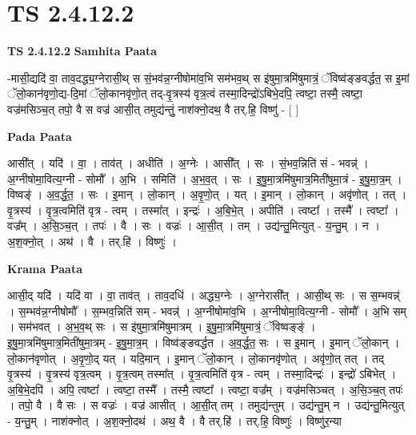\documentclass[17pt]{extarticle}
\begin{document}
\section{ TS 2.4.12.2 }

\textbf{TS 2.4.12.2 } \newline
\textbf{Samhita Paata} \newline

-मासी॒द्यदि॑ वा॒ ताव॒दद्ध्य॒ग्नेरासी॒थ् स सं॒भव॑न्न॒ग्नीषोमा॑व॒भि सम॑भव॒थ् स इ॑षुमा॒त्रमि॑षुमात्रं॒ ॅविष्व॑ङ्ङवर्द्धत॒ स इ॒मां ॅलो॒कान॑वृणो॒द्य-दि॒मां ॅलो॒कानवृ॑णो॒त् तद्-वृ॒त्रस्य॑ वृत्र॒त्वं तस्मा॒दिन्द्रो॑ऽबिभे॒दपि॒ त्वष्टा॒ तस्मै॒ त्वष्टा॒ वज्र॑मसिञ्च॒त् तपो॒ वै स वज्र॑ आसी॒त् तमुद्य॑न्तुं॒ नाश॑क्नो॒दथ॒ वै तर्.हि॒ विष्णु॑ - [  ] \newline

\textbf{Pada Paata} \newline

आसी᳚त् । यदि॑ । वा॒ । ताव॑त् । अधीति॑ । अ॒ग्नेः । आसी᳚त् ।   सः । सं॒भव॒न्निति॑ सं - भवन्न्॑ । अ॒ग्नीषोमा॒वित्य॒ग्नी - सोमौ᳚ । अ॒भि । समिति॑ । अ॒भ॒व॒त् । सः । इ॒षु॒मा॒त्रमि॑षुमात्र॒मिती॑षुमा॒त्रं - इ॒षु॒मा॒त्र॒म् । विष्वङ्॑ । अ॒व॒र्द्ध॒त॒ । सः । इ॒मान् । लो॒कान् । अ॒वृ॒णो॒त् । यत् । इ॒मान् । लो॒कान् । अवृ॑णोत् । तत् । वृ॒त्रस्य॑ । वृ॒त्र॒त्वमिति॑ वृत्र - त्वम् । तस्मा᳚त् । इन्द्रः॑ । अ॒बि॒भे॒त् । अपीति॑ । त्वष्टा᳚ । तस्मै᳚ । त्वष्टा᳚ । वज्र᳚म् । अ॒सि॒ञ्च॒त् । तपः॑ । वै । सः । वज्रः॑ । आ॒सी॒त् । तम् । उद्य॑न्तु॒मित्युत् -   य॒न्तु॒म् । न । अ॒श॒क्नो॒त् । अथ॑ । वै । तर्.हि॑ । विष्णुः॑ ।  \newline


\textbf{Krama Paata} \newline

आसी॒द् यदि॑ । यदि॑ वा । वा॒ ताव॑त् । ताव॒दधि॑ । अद्ध्य॒ग्नेः । अ॒ग्नेरासी᳚त् । आसी॒थ् सः । स स॒म्भवन्न्॑ । स॒म्भव॑न्न॒ग्नीषोमौ᳚ । स॒म्भव॒न्निति॑ सम् - भवन्न्॑ । अ॒ग्नीषोमा॑व॒भि । अ॒ग्नीषोमा॒वित्य॒ग्नी - सोमौ᳚ । अ॒भि सम् । सम॑भवत् । अ॒भ॒व॒थ् सः । स इ॑षुमा॒त्रमि॑षुमात्रम् । इ॒षु॒मा॒त्रमि॑षुमात्रं॒ ॅविष्वङ्ङ्॑ । इ॒षु॒मा॒त्रमि॑षुमात्र॒मिती॑षुमा॒त्रम् - इ॒षु॒मा॒त्र॒म् । विष्व॑ङ्ङवर्द्धत । अ॒व॒र्द्ध॒त॒ सः । स इ॒मान् । इ॒मान् ॅलो॒कान् । लो॒कान॑वृणोत् । अ॒वृ॒णो॒द् यत् । यदि॒मान् । इ॒मान् ॅलो॒कान् । लो॒कानवृ॑णोत् । अवृ॑णो॒त् तत् । तद् वृ॒त्रस्य॑ । वृ॒त्रस्य॑ वृत्र॒त्वम् । वृ॒त्र॒त्वम् तस्मा᳚त् । वृ॒त्र॒त्वमिति॑ वृत्र - त्वम् । तस्मा॒दिन्द्रः॑ । इन्द्रो॑ ऽबिभेत् । अ॒बि॒भे॒दपि॑ । अपि॒ त्वष्टा᳚ । त्वष्टा॒ तस्मै᳚ । तस्मै॒ त्वष्टा᳚ । त्वष्टा॒ वज्र᳚म् । वज्र॑मसिञ्चत् । अ॒सि॒ञ्च॒त् तपः॑ । तपो॒ वै । वै सः । स वज्रः॑ । वज्र॑ आसीत् । आ॒सी॒त् तम् । तमुद्य॑न्तुम् । उद्य॑न्तु॒म् न । उद्य॑न्तु॒मित्युत् - य॒न्तु॒म् । नाश॑क्नोत् । अ॒श॒क्नो॒दथ॑ । अथ॒ वै । वै तर्.हि॑ । तर्.हि॒ विष्णुः॑ । विष्णु॑र॒न्या \newline
\end{document}
